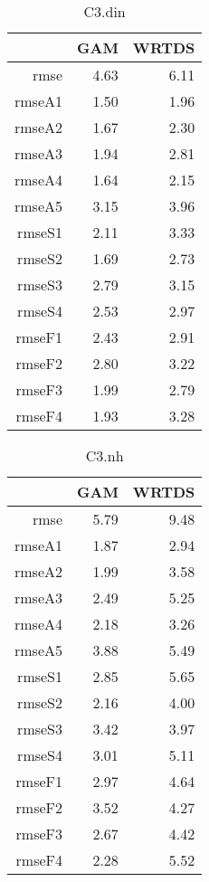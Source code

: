 \documentclass[12pt]{amsart}
\begin{document}
\begin{table}[H]
\centering
\begin{tabular}{rrr}
  \hline
 & GAM & WRTDS \\ 
  \hline
rmse & 4.63 & 6.11 \\ 
  rmseA1 & 1.50 & 1.96 \\ 
  rmseA2 & 1.67 & 2.30 \\ 
  rmseA3 & 1.94 & 2.81 \\ 
  rmseA4 & 1.64 & 2.15 \\ 
  rmseA5 & 3.15 & 3.96 \\ 
  rmseS1 & 2.11 & 3.33 \\ 
  rmseS2 & 1.69 & 2.73 \\ 
  rmseS3 & 2.79 & 3.15 \\ 
  rmseS4 & 2.53 & 2.97 \\ 
  rmseF1 & 2.43 & 2.91 \\ 
  rmseF2 & 2.80 & 3.22 \\ 
  rmseF3 & 1.99 & 2.79 \\ 
  rmseF4 & 1.93 & 3.28 \\ 
   \hline
\end{tabular}
\caption{C3.din}
\end{table}

\begin{table}[H]
\centering
\begin{tabular}{rrr}
  \hline
 & GAM & WRTDS \\ 
  \hline
rmse & 5.79 & 9.48 \\ 
  rmseA1 & 1.87 & 2.94 \\ 
  rmseA2 & 1.99 & 3.58 \\ 
  rmseA3 & 2.49 & 5.25 \\ 
  rmseA4 & 2.18 & 3.26 \\ 
  rmseA5 & 3.88 & 5.49 \\ 
  rmseS1 & 2.85 & 5.65 \\ 
  rmseS2 & 2.16 & 4.00 \\ 
  rmseS3 & 3.42 & 3.97 \\ 
  rmseS4 & 3.01 & 5.11 \\ 
  rmseF1 & 2.97 & 4.64 \\ 
  rmseF2 & 3.52 & 4.27 \\ 
  rmseF3 & 2.67 & 4.42 \\ 
  rmseF4 & 2.28 & 5.52 \\ 
   \hline
\end{tabular}
\caption{C3.nh}
\end{table}
\end{document}
